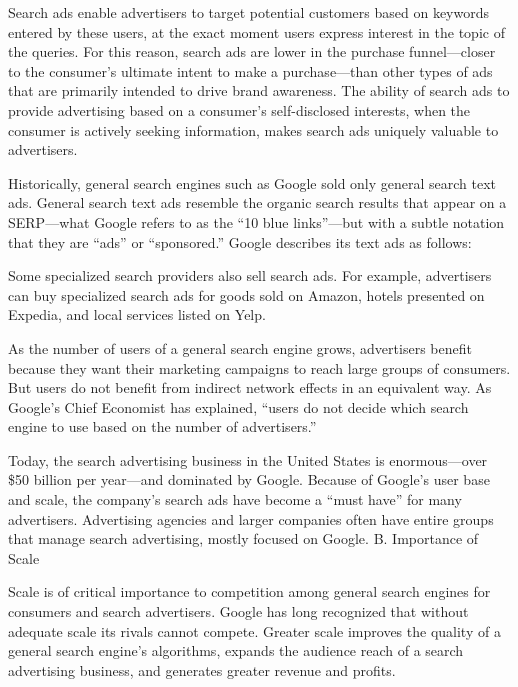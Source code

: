 \documentclass[11pt,b5paper]{scrartcl}
\begin{document}

Search ads enable advertisers to target potential customers based on keywords
entered by these users, at the exact moment users express interest in the topic of the queries. For
this reason, search ads are lower in the purchase funnel—closer to the consumer’s ultimate intent
to make a purchase—than other types of ads that are primarily intended to drive brand
awareness. The ability of search ads to provide advertising based on a consumer’s self-disclosed
interests, when the consumer is actively seeking information, makes search ads uniquely
valuable to advertisers.


Historically, general search engines such as Google sold only general search text
ads. General search text ads resemble the organic search results that appear on a SERP—what
Google refers to as the “10 blue links”—but with a subtle notation that they are “ads” or
“sponsored.” Google describes its text ads as follows:


Some specialized search providers also sell search ads. For example, advertisers
can buy specialized search ads for goods sold on Amazon, hotels presented on Expedia, and local
services listed on Yelp.


As the number of users of a general search engine grows, advertisers benefit
because they want their marketing campaigns to reach large groups of consumers. But users do
not benefit from indirect network effects in an equivalent way. As Google’s Chief Economist has
explained, “users do not decide which search engine to use based on the number of advertisers.”


Today, the search advertising business in the United States is enormous—over
\$50 billion per year—and dominated by Google. Because of Google’s user base and scale, the
company’s search ads have become a “must have” for many advertisers. Advertising agencies
and larger companies often have entire groups that manage search advertising, mostly focused on
Google.
B.
Importance of Scale


Scale is of critical importance to competition among general search engines for
consumers and search advertisers. Google has long recognized that without adequate scale its
rivals cannot compete. Greater scale improves the quality of a general search engine’s
algorithms, expands the audience reach of a search advertising business, and generates greater
revenue and profits.
\end{document}
